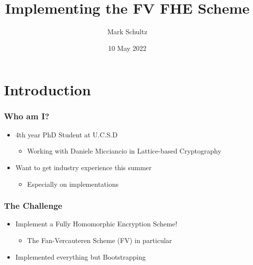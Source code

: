 \documentclass{beamer}
\title{Implementing the FV FHE Scheme}
\author{Mark Schultz}
\institute{University of California San Diego}
\date{10 May 2022} %
\theoremstyle{definition}
\begin{document}
{
\begin{frame} 
\titlepage
\end{frame}
}

\section{Introduction}

\begin{frame}
	\frametitle{Who am I?}
	\begin{itemize}
		\item 4th year PhD Student at U.C.S.D\pause
\begin{itemize}
	\item Working with Daniele Micciancio in Lattice-based Cryptography\pause{}
\end{itemize}
\item Want to get industry experience this summer\pause{}
\begin{itemize}
	\item Especially on implementations
\end{itemize}
	\end{itemize}
\end{frame}

\begin{frame}
	\frametitle{The Challenge}
	\begin{itemize}
		\item Implement a Fully Homomorphic Encryption Scheme!\pause{}
		\begin{itemize}
			\item The Fan-Vercauteren Scheme (FV) in particular\pause{}
		\end{itemize}
	\item Implemented everything but Bootstrapping
	\end{itemize}
\end{frame}
\end{document}
